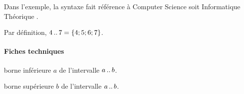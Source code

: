 \documentclass[12pt,a4paper]{article}
\begin{document}
Dans l'exemple, la syntaxe fait référence à \og Computer Science \fg{} soit \og Informatique Théorique \fg{}.

\begin{tcblisting}{}
Par définition, $\CSinterval{4}{7} = \{ 4 ; 5 ; 6 ; 7 \}$.
\end{tcblisting}


\paragraph{Fiches techniques}


 borne inférieure $a$ de l'intervalle $a\,..\,b$.

 borne supérieure $b$ de l'intervalle $a\,..\,b$.
\end{document}
